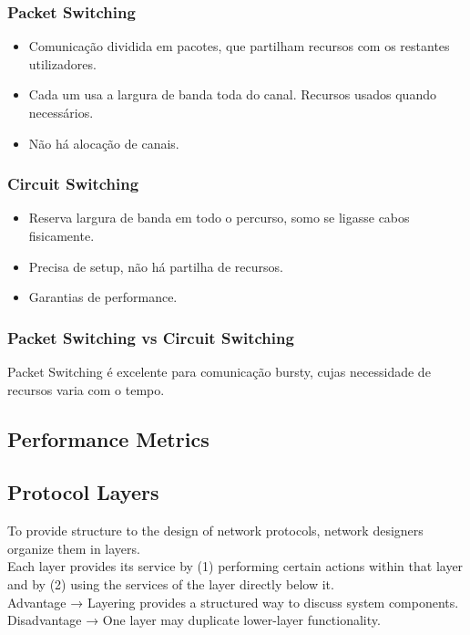 \documentclass[12pt]{article}
\begin{document}
\subsubsection{Packet Switching}

\begin{itemize}
    \item Comunicação dividida em pacotes, que partilham recursos com os restantes utilizadores.
    \item Cada um usa a largura de banda toda do canal. Recursos usados quando necessários.
    \item Não há alocação de canais.
\end{itemize}

\subsubsection{Circuit Switching}

\begin{itemize}
    \item Reserva largura de banda em todo o percurso, somo se ligasse cabos fisicamente.
    \item Precisa de setup, não há partilha de recursos.
    \item Garantias de performance. 
\end{itemize}

\subsubsection*{Packet Switching vs Circuit Switching}

Packet Switching é excelente para comunicação bursty, cujas necessidade de recursos varia com o tempo.

\subsection{Performance Metrics}

\subsection{Protocol Layers}

To provide structure to the design of network protocols, network designers organize them in layers. \\
Each layer provides its service by (1) performing certain actions within
that layer and by (2) using the services of the layer directly below it.
\vspace{0.5cm} \\
Advantage → Layering provides a structured way to discuss system components. \\
Disadvantage → One layer may duplicate lower-layer functionality. \\
\end{document}
